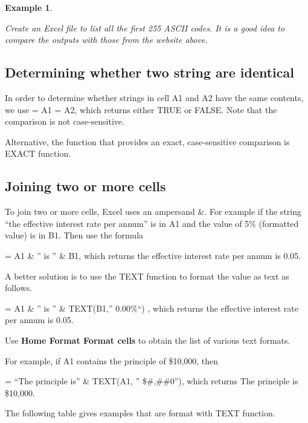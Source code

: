 \documentclass[
]{article}
\theoremstyle{definition}
\theoremstyle{definition}
\newtheorem{example}{Example}[section]
\theoremstyle{definition}
\theoremstyle{definition}
\theoremstyle{remark}
\begin{document}
\begin{example}
\protect\hypertarget{exm:unlabeled-div-2}{}\label{exm:unlabeled-div-2}

\emph{Create an Excel file to list all the first 255 ASCII
codes. It is a good idea to compare the outputs with those from the
website above.}

\end{example}

\hypertarget{determining-whether-two-string-are-identical}{%
\subsection{Determining whether two string are identical}\label{determining-whether-two-string-are-identical}}

In order to determine whether strings in cell A1 and A2 have the same
contents, we use = A1 = A2, which returns either TRUE or FALSE. Note
that the comparison is not case-sensitive.

Alternative, the function that provides an exact, case-sensitive
comparison is EXACT function.

\hypertarget{joining-two-or-more-cells}{%
\subsection{Joining two or more cells}\label{joining-two-or-more-cells}}

To join two or more cells, Excel uses an ampersand \&. For example if the
string ``the effective interest rate per annum'' is in A1 and the value of
5\% (formatted value) is in B1. Then use the formula

= A1 \& '' is '' \& B1, which returns the effective interest rate per annum
is 0.05.

A better solution is to use the TEXT function to format the value as
text as follows.

= A1 \& '' is '' \& TEXT(B1,'' 0.00\%``) , which returns the effective interest
rate per annum is 0.05.

Use \textbf{Home Format Format cells} to obtain the list of various text
formats.

For example, if A1 contains the principle of \$10,000, then

= ``The principle is'' \& TEXT(A1, '' \$\#,\#\#0''), which returns The
principle is \$10,000.

The following table gives examples that are format with TEXT function.
\end{document}
